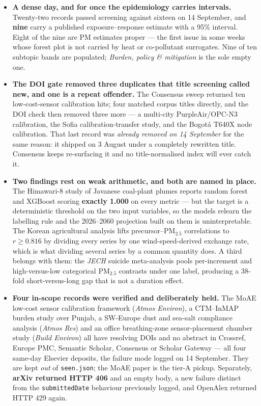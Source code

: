 \documentclass[10pt]{article}
\begin{document}
\footnotesize
\begin{itemize}
\item \textbf{A dense day, and for once the epidemiology carries intervals.} Twenty-two
records passed screening against sixteen on 14 September, and \textbf{nine} carry a
published exposure--response estimate with a 95\% interval. Eight of the nine are PM
estimates proper --- the first issue in some weeks whose forest plot is not carried by
heat or co-pollutant surrogates. Nine of ten subtopic bands are populated;
\textit{Burden, policy \& mitigation} is the sole empty one.

\item \textbf{The DOI gate removed three duplicates that title screening called new, and
one is a repeat offender.} The Consensus sweep returned ten low-cost-sensor calibration
hits; four matched corpus titles directly, and the DOI check then removed three more ---
a multi-city PurpleAir/OPC-N3 calibration, the Sofia calibration-transfer study, and the
Bogot\'a T640X node calibration. That last record was \emph{already removed on
14 September} for the same reason: it shipped on 3 August under a completely rewritten
title. Consensus keeps re-surfacing it and no title-normalised index will ever catch it.

\item \textbf{Two findings rest on weak arithmetic, and both are named in place.} The
Himawari-8 study of Javanese coal-plant plumes reports random forest and XGBoost scoring
\textbf{exactly 1.000} on every metric --- but the target is a deterministic threshold on
the two input variables, so the models relearn the labelling rule and the 2026--2060
projection built on them is uninterpretable. The Korean agricultural analysis lifts
precursor--PM$_{2.5}$ correlations to $r \ge 0.816$ by dividing every series by one
wind-speed-derived exchange rate, which is what dividing several series by a common
quantity does. A third belongs with them: the \textit{JECH} suicide meta-analysis pools
per-increment and high-versus-low categorical PM$_{2.5}$ contrasts under one label,
producing a 38-fold short-versus-long gap that is not a duration effect.

\item \textbf{Four in-scope records were verified and deliberately held.} The MoAE
low-cost sensor calibration framework (\textit{Atmos Environ}), a CTM--InMAP burden study
over Punjab, a SW-Europe dust and sea-salt compliance analysis (\textit{Atmos Res}) and an
office breathing-zone sensor-placement chamber study (\textit{Build Environ}) all have
resolving DOIs and no abstract in Crossref, Europe PMC, Semantic Scholar, Consensus or
Scholar Gateway --- all four same-day Elsevier deposits, the failure mode logged on
14 September. They are kept \emph{out} of \texttt{seen.json}; the MoAE paper is the
tier-A pickup. Separately, \textbf{arXiv returned HTTP 406} and an empty body, a new
failure distinct from the \texttt{submittedDate} behaviour previously logged, and
OpenAlex returned HTTP 429 again.


\end{itemize}
\end{document}

